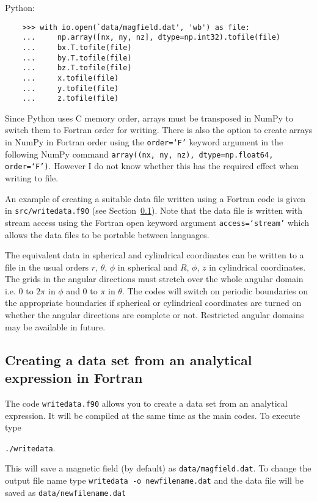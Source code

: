 \documentclass[12pt]{article}
\begin{document}
    Python:

    \begin{verbatim}
    >>> with io.open(`data/magfield.dat', 'wb') as file:
    ...     np.array([nx, ny, nz], dtype=np.int32).tofile(file)
    ...     bx.T.tofile(file)
    ...     by.T.tofile(file)
    ...     bz.T.tofile(file)
    ...     x.tofile(file)
    ...     y.tofile(file)
    ...     z.tofile(file)
    \end{verbatim}

    Since Python uses C memory order, arrays must be transposed in NumPy to switch them to Fortran order for writing. There is also the option to create arrays in NumPy in Fortran order using the \texttt{order=`F'} keyword argument in the following NumPy command \texttt{array((nx, ny, nz), dtype=np.float64, order=`F')}. However I do not know whether this has the required effect when writing to file.

    An example of creating a suitable data file written using a Fortran code is given in \texttt{src/writedata.f90} (see Section~\ref{sec:writedata}). Note that the data file is written with stream access using the Fortran open keyword argument \texttt{access=`stream'} which allows the data files to be portable between languages.

    The equivalent data in spherical and cylindrical coordinates can be written to a file in the usual orders \( r \), \( \theta \), \( \phi \) in spherical and \( R \), \( \phi \), \( z \) in cylindrical coordinates. The grids in the angular directions must stretch over the whole angular domain i.e. \( 0 \) to \( 2\pi \) in \( \phi \) and \( 0 \) to \( \pi \) in \( \theta \). The codes will switch on periodic boundaries on the appropriate boundaries if spherical or cylindrical coordinates are turned on whether the angular directions are complete or not. Restricted angular domains may be available in future.

    \subsection{Creating a data set from an analytical expression in Fortran}
      \label{sec:writedata}

      The code \texttt{writedata.f90} allows you to create a data set from an analytical expression. It will be compiled at the same time as the main codes. To execute type

      \texttt{./writedata}.

      This will save a magnetic field (by default) as \texttt{data/magfield.dat}. To change the output file name type \texttt{writedata -o newfilename.dat} and the data file will be saved as \texttt{data/newfilename.dat}
\end{document}
